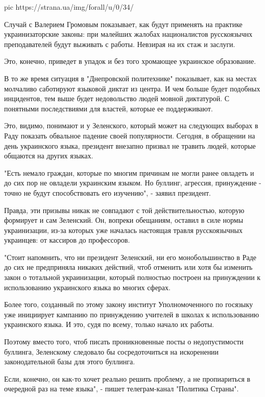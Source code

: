 \ifcmt
pic https://strana.ua/img/forall/u/0/34/%
\fi

Случай с Валерием Громовым показывает, как будут применять на практике
украинизаторские законы: при малейших жалобах националистов русскоязычнх
преподавателей будут выживать с работы. Невзирая на их стаж и заслуги.

Это, конечно, приведет в упадок и без того хромающее украинское образование.

В то же время ситуация в "Днепровской политехнике" показывает, как на местах
молчаливо саботируют языковой диктат из центра. И чем больше будет подобных
инцидентов, тем выше будет недовольство людей мовной диктатурой. С понятными
последствиями для властей, которые ее поддерживают. 

Это, видимо, понимают и у Зеленского, который может на следующих выборах в Раду
показать обвальное падение своей популярности. Сегодня, в обращении на день
украинского языка, президент внезапно призвал не травить людей, которые
общаются на других языках.

"Есть немало граждан, которые по многим причинам не могли ранее овладеть и до
сих пор не овладели украинским языком. Но буллинг, агрессия, принуждение -
точно не будут способствовать его изучению", - заявил президент. 

Правда, эти призывы никак не совпадают с той действительностью, которую
формирует и сам Зеленский. Он, вопреки обещаниям, оставил в силе нормы
украинизации, из-за которых уже началась настоящая травля русскоязычных
украинцев: от кассиров до профессоров. 

"Стоит напомнить, что ни президент Зеленский, ни его монобольшинство в Раде до
сих не предприняла никаких действий, чтоб отменить или хотя бы изменить закон о
тотальной украинизации, который полностью построен на принуждении к
использованию украинского языка во многих сферах.

Более того, созданный по этому закону институт Уполномоченного по госязыку уже
инициирует кампанию по принуждению учителей в школах к использованию
украинского языка. И это, судя по всему, только начало их работы.

Поэтому вместо того, чтоб писать проникновенные посты о недопустимости
буллинга, Зеленскому следовало бы сосредоточиться на искоренении
законодательной базы для этого буллинга.

Если, конечно, он как-то хочет реально решить проблему, а не пропиариться в
очередной раз на теме языка", - пишет телеграм-канал "Политика Страны".
  

